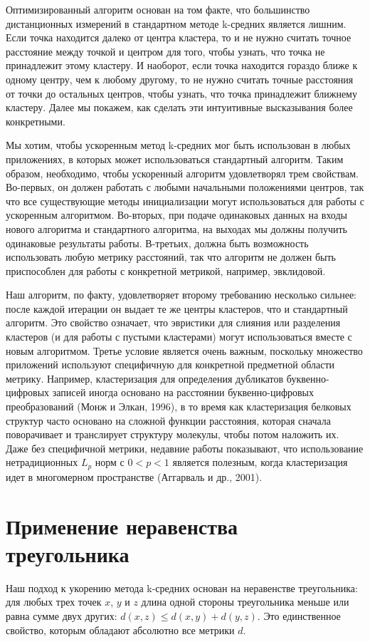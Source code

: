 Оптимизированный алгоритм основан на том факте, что большинство дистанционных измерений в стандартном методе k-средних является лишним. Если точка находится далеко от центра кластера, то и не нужно считать точное расстояние между точкой и центром для того, чтобы узнать, что точка не принадлежит этому кластеру. И наоборот, если точка находится гораздо ближе к одному центру, чем к любому другому, то не нужно считать точные расстояния от точки до остальных центров, чтобы узнать, что точка принадлежит ближнему кластеру. Далее мы покажем, как сделать эти интуитивные высказывания более конкретными.

Мы хотим, чтобы ускоренным метод k-средних мог быть использован в любых приложениях, в которых может использоваться стандартный алгоритм. Таким образом, необходимо, чтобы ускоренный алгоритм удовлетворял трем свойствам. Во-первых, он должен работать с любыми начальными положениями центров, так что все существующие методы инициализации могут использоваться для работы с ускоренным алгоритмом. Во-вторых, при подаче одинаковых данных на входы нового алгоритма и стандартного алгоритма, на выходах мы должны получить одинаковые результаты работы. В-третьих, должна быть возможность использовать любую метрику расстояний, так что алгоритм не должен быть приспособлен для работы с конкретной метрикой, например, эвклидовой.

Наш алгоритм, по факту, удовлетворяет второму требованию несколько сильнее: после каждой итерации он выдает те же центры кластеров, что и стандартный алгоритм. Это свойство означает, что эвристики для слияния или разделения кластеров (и для работы с пустыми кластерами) могут использоваться вместе с новым алгоритмом. Третье условие является очень важным, поскольку множество приложений используют специфичную для конкретной предметной области метрику. Например, кластеризация для определения дубликатов буквенно-цифровых записей иногда основано на расстоянии буквенно-цифровых преобразований (Монж и Элкан, 1996), в то время как кластеризация белковых структур часто основано на сложной функции расстояния, которая сначала поворачивает и транслирует структуру молекулы, чтобы потом наложить их. Даже без специфичной метрики, недавние работы показывают, что использование нетрадиционных \( L_p \) норм с \( 0 < p < 1 \) является полезным, когда кластеризация идет в многомерном пространстве (Аггарваль и др., 2001).

\chapter{Применение неравенства треугольника}
Наш подход к укорению метода k-средних основан на неравенстве треугольника: для любых трех точек \( x \), \( y \) и \( z \) длина одной стороны треугольника меньше или равна сумме двух других: \( d(x, z) \le d(x, y) + d(y, z) \). Это единственное свойство, которым обладают абсолютно все метрики \( d \).

